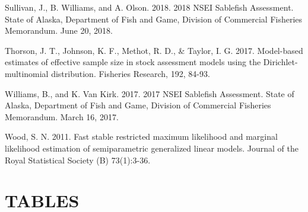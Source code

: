 \documentclass[
]{article}
\begin{document}
Sullivan, J., B. Williams, and A. Olson. 2018. 2018 NSEI Sablefish
Assessment. State of Alaska, Department of Fish and Game, Division of
Commercial Fisheries Memorandum. June 20, 2018.

Thorson, J. T., Johnson, K. F., Methot, R. D., \& Taylor, I. G. 2017.
Model-based estimates of effective sample size in stock assessment
models using the Dirichlet-multinomial distribution. Fisheries Research,
192, 84-93.

Williams, B., and K. Van Kirk. 2017. 2017 NSEI Sablefish Assessment.
State of Alaska, Department of Fish and Game, Division of Commercial
Fisheries Memorandum. March 16, 2017.

Wood, S. N. 2011. Fast stable restricted maximum likelihood and marginal
likelihood estimation of semiparametric generalized linear models.
Journal of the Royal Statistical Society (B) 73(1):3-36.

\newpage

\hypertarget{tables}{%
\section{TABLES}\label{tables}}
\end{document}

